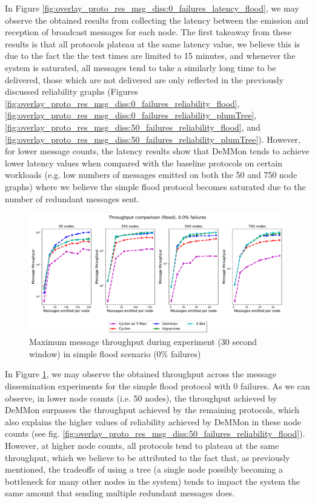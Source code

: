 In Figure \ref{fig:overlay_proto_res_msg_diss:0_failures_latency_flood}, we may observe the obtained results from collecting the latency between the emission and reception of broadcast messages for each node. The first takeaway from these results is that all protocols plateau at the same latency value, we believe this is due to the fact the the test times are limited to 15 minutes, and whenever the system is saturated, all messages tend to take a similarly long time to be delivered, those which are not delivered are only reflected in the previously discussed reliability graphs (Figures \ref{fig:overlay_proto_res_msg_diss:0_failures_reliability_flood}, \ref{fig:overlay_proto_res_msg_diss:0_failures_reliability_plumTree}, \ref{fig:overlay_proto_res_msg_diss:50_failures_reliability_flood}, and \ref{fig:overlay_proto_res_msg_diss:50_failures_reliability_plumTree}). However, for lower message counts, the latency results show that DeMMon tends to achieve lower latency values when compared with the baseline protocols on certain workloads (e.g. low numbers of messages emitted on both the 50 and 750 node graphs) where we believe the simple flood protocol becomes saturated due to the number of redundant messages sent.

\begin{figure}[htbp]
    \centering
    \includegraphics[width=\linewidth]{Chapters/evaluation/figures/flood/flood_0.0_failures_throughput.pdf}
    \caption{Maximum message throughput during experiment (30 second window) in simple flood scenario (0\% failures)}
    \label{fig:overlay_proto_res_msg_diss:0_failures_throughput_flood}
\end{figure}

In Figure \ref{fig:overlay_proto_res_msg_diss:0_failures_throughput_flood}, we may observe the obtained throughput across the message dissemination experiments for the simple flood protocol with 0 failures. As we can observe, in lower node counts (i.e. 50 nodes), the throughput achieved by DeMMon surpasses the throughput achieved by the remaining protocols, which also explains the higher values of reliability achieved by DeMMon in these node counts (see fig. \ref{fig:overlay_proto_res_msg_diss:50_failures_reliability_flood}). However, at higher node counts, all protocols tend to plateau at the same throughput, which we believe to be attributed to the fact that, as previously mentioned, the tradeoffs of using a tree (a single node possibly becoming a bottleneck for many other nodes in the system) tends to impact the system the same amount that sending multiple redundant messages does.

